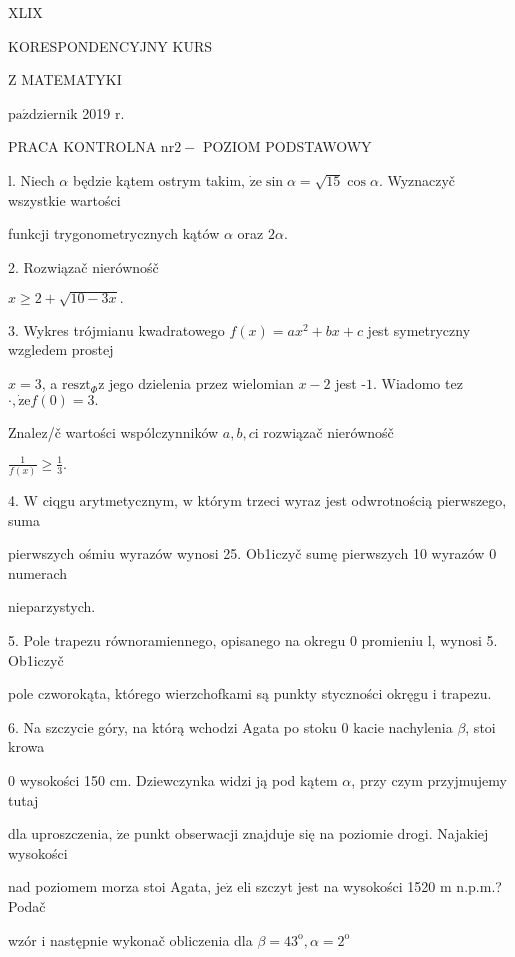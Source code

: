 \documentclass[a4paper,12pt]{article}
\begin{document}
XLIX

KORESPONDENCYJNY KURS

Z MATEMATYKI

$\mathrm{p}\mathrm{a}\acute{\mathrm{z}}$dziernik 2019 $\mathrm{r}.$

PRACA KONTROLNA $\mathrm{n}\mathrm{r} 2-$ POZIOM PODSTAWOWY

l. Niech $\alpha$ będzie kątem ostrym takim, $\dot{\mathrm{z}}\mathrm{e}\sin\alpha=\sqrt{15}\cos\alpha$. Wyznaczyč wszystkie wartości

funkcji trygonometrycznych kątów $\alpha$ oraz $2\alpha.$

2. Rozwiązač nierównośč

$x\geq 2+\sqrt{10-3x}.$

3. Wykres trójmianu kwadratowego $f(x)=ax^{2}+bx+c$ jest symetryczny wzgledem prostej

$x=3$, a $\mathrm{r}\mathrm{e}\mathrm{s}\mathrm{z}\mathrm{t}_{\Phi}\mathrm{z}$ jego dzielenia przez wielomian $x-2$ jest -$1$. Wiadomo tez$\cdot, \dot{\mathrm{z}}\mathrm{e}f(0)=3.$

Znalez/č wartości wspólczynników $a, b, c\mathrm{i}$ rozwiązač nierównośč

$\displaystyle \frac{1}{f(x)}\geq\frac{1}{3}.$

4. $\mathrm{W}$ ciqgu arytmetycznym, $\mathrm{w}$ którym trzeci wyraz jest odwrotnością pierwszego, suma

pierwszych ośmiu wyrazów wynosi 25. Ob1iczyč sumę pierwszych 10 wyrazów $0$ numerach

nieparzystych.

5. Pole trapezu równoramiennego, opisanego na okregu $0$ promieniu l, wynosi 5. Ob1iczyč

pole czworokąta, którego wierzchofkami są punkty styczności okręgu $\mathrm{i}$ trapezu.

6. Na szczycie góry, na którą wchodzi Agata po stoku $0$ kacie nachylenia $\beta$, stoi krowa

$0$ wysokości 150 cm. Dziewczynka widzi ją pod kątem $\alpha$, przy czym przyjmujemy tutaj

dla uproszczenia, $\dot{\mathrm{z}}\mathrm{e}$ punkt obserwacji znajduje się na poziomie drogi. Najakiej wysokości

nad poziomem morza stoi Agata, $\mathrm{j}\mathrm{e}\dot{\mathrm{z}}$ eli szczyt jest na wysokości 1520 $\mathrm{m}$ n.p.m.? Podač

wzór $\mathrm{i}$ następnie wykonač obliczenia dla $\beta=43^{\mathrm{o}}, \alpha=2^{\mathrm{o}}$
\end{document}
